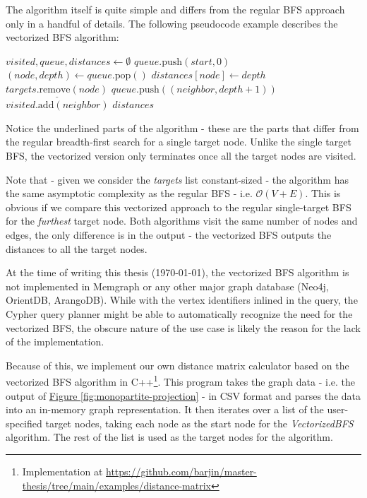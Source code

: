 The algorithm itself is quite simple and differs from the regular BFS approach only in a handful of details.
The following pseudocode example describes the vectorized BFS algorithm:

\begin{algorithmic}[1]
        \State $visited, queue, distances \gets \emptyset$
        \State $queue.\text{push}(start, 0)$
            \State $(node, depth) \gets queue.\text{pop}()$
                \State $distances[node] \gets depth$
                \State $\underline{targets.\text{remove}(node)}$
            \EndIf
                    \State $queue.\text{push}((neighbor, depth + 1))$
                    \State $visited.\text{add}(neighbor)$
                \EndIf
            \EndFor
        \EndWhile
        \State \Return $distances$
    \EndFunction
\end{algorithmic}

Notice the underlined parts of the algorithm - these are the parts that differ from the regular breadth-first search for a single target node.
Unlike the single target BFS, the vectorized version only terminates once all the target nodes are visited.

Note that - given we consider the \textit{targets} list constant-sized - the algorithm has the same asymptotic complexity as the regular BFS - i.e. $\mathcal{O}(V + E)$.
This is obvious if we compare this vectorized approach to the regular single-target BFS for the \textit{furthest} target node.
Both algorithms visit the same number of nodes and edges, the only difference is in the output - the vectorized BFS outputs the distances to all the target nodes.

At the time of writing this thesis (\today), the vectorized BFS algorithm is not implemented
in Memgraph or any other major graph database (Neo4j, OrientDB, ArangoDB). 
While with the vertex identifiers inlined in the query, the Cypher query planner might be able to automatically recognize the 
need for the vectorized BFS, the obscure nature of the use case is likely the reason for the lack of the implementation.

Because of this, we implement our own distance matrix calculator based on the vectorized BFS algorithm in C++\footnote{Implementation at \url{https://github.com/barjin/master-thesis/tree/main/examples/distance-matrix}}.
This program takes the graph data - i.e. the output of \hyperref[fig:monopartite-projection]{Figure \ref*{fig:monopartite-projection}} - in CSV format and parses the data into an in-memory graph representation.
It then iterates over a list of the user-specified target nodes, taking each node as the start node for the \textit{VectorizedBFS} algorithm.
The rest of the list is used as the target nodes for the algorithm. 

